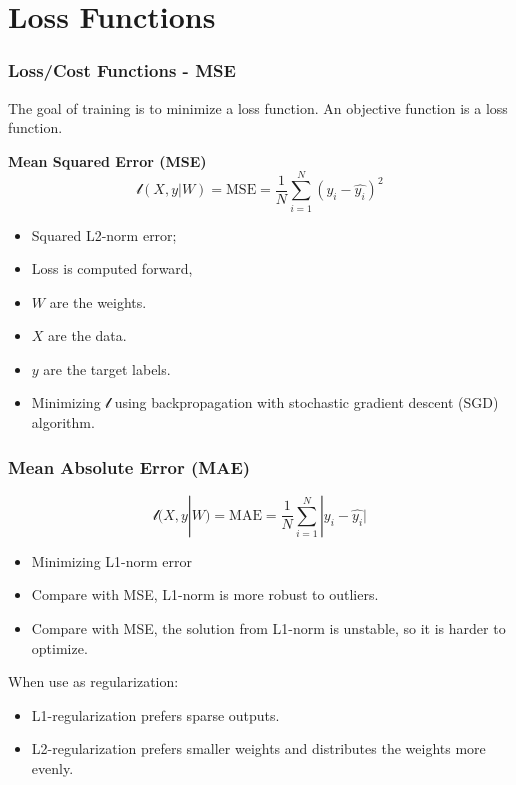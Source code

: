 \documentclass[aspectratio=169, 10pt]{beamer}
\begin{document}
\section{Loss Functions}
\begin{frame}
    \frametitle{Loss/Cost Functions - MSE}
    
    The goal of training is to minimize a loss function. 
    An objective function is a loss function.\break

    \textbf{Mean Squared Error (MSE)}
    \[
        \mathcal{l}(X, y| W) = \text{MSE} = \frac{1}{N} \sum_{i=1}^{N}(y_i - \hat{y_i})^2
    \]

    \begin{itemize}
        \item Squared L2-norm error;
        \item Loss is computed forward,
        \item $W$ are the weights.
        \item $X$ are the data.
        \item $y$ are the target labels.
        \item Minimizing $\mathcal{l}$ using backpropagation with stochastic gradient descent (SGD) algorithm.
    \end{itemize}
\end{frame}

\begin{frame}
    \frametitle{Mean Absolute Error (MAE)}
    
    \[
        \mathcal{l}(X, y| W) = \text{MAE} = \frac{1}{N} \sum_{i=1}^{N}|y_i - \hat{y_i}|
    \]

    \begin{itemize}
        \item Minimizing L1-norm error
        \item Compare with MSE, L1-norm is more robust to outliers.
        \item Compare with MSE, the solution from L1-norm is unstable, so it is harder to optimize.
    \end{itemize}

    When use as regularization:
    \begin{itemize}
        \item L1-regularization prefers sparse outputs.
        \item L2-regularization prefers smaller weights and distributes the weights more evenly.
    \end{itemize}

\end{frame}
\end{document}
